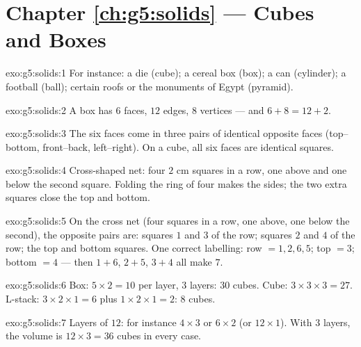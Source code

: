 \section*{Chapter \ref{ch:g5:solids} --- Cubes and Boxes}

\begin{solution}{exo:g5:solids:1}
For instance: a die (cube); a cereal box (box); a can (cylinder); a
football (ball); certain roofs or the monuments of Egypt
(pyramid).
\end{solution}

\begin{solution}{exo:g5:solids:2}
A box has $6$ faces, $12$ edges, $8$ vertices --- and
$6 + 8 = 12 + 2$. \checkmark
\end{solution}

\begin{solution}{exo:g5:solids:3}
The six faces come in three pairs of identical opposite faces
(top--bottom, front--back, left--right). On a cube, all six faces
are identical squares.
\end{solution}

\begin{solution}{exo:g5:solids:4}
Cross-shaped net: four $2$ cm squares in a row, one above and one
below the second square. Folding the ring of four makes the sides;
the two extra squares close the top and bottom.
\end{solution}

\begin{solution}{exo:g5:solids:5}
On the cross net (four squares in a row, one above, one below the
second), the opposite pairs are: squares $1$ and $3$ of the row;
squares $2$ and $4$ of the row; the top and bottom squares. One
correct labelling: row $= 1, 2, 6, 5$; top $= 3$; bottom $= 4$
--- then $1{+}6$, $2{+}5$, $3{+}4$ all make $7$.
\end{solution}

\begin{solution}{exo:g5:solids:6}
Box: $5 \times 2 = 10$ per layer, $3$ layers: $30$ cubes. Cube:
$3 \times 3 \times 3 = 27$. L-stack: $3 \times 2 \times 1 = 6$ plus
$1 \times 2 \times 1 = 2$: $8$ cubes.
\end{solution}

\begin{solution}{exo:g5:solids:7}
Layers of $12$: for instance $4 \times 3$ or $6 \times 2$ (or
$12 \times 1$). With $3$ layers, the volume is
$12 \times 3 = 36$ cubes in every case.
\end{solution}

